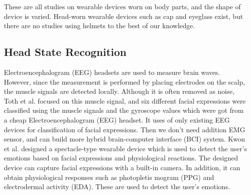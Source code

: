 \documentclass[sigchi,authordraft]{acmart}
\begin{document}

These are all studies on wearable devices worn on body parts, and the shape of device is varied. Head-worn wearable devices such as cap and eyeglass exist, but there are no studies using helmets to the best of our knowledge.


\subsection{Head State Recognition}
Electroencephalogram (EEG) headsets are used to measure brain waves. However, since the measurement is performed by placing electrodes on the scalp, the muscle signals are detected locally. Although it is often removed as noise, Toth et al.\cite{facial_expression_headset} focused on this muscle signal, and six different facial expressions were classified using the muscle signals and the gyroscope values which were got from a cheap Electroencephalogram (EEG) headset. It uses of only existing EEG devices for classification of facial expressions. Then we don't need addition EMG sensor, and can build more hybrid brain-computer interface (BCI) system. Kwon et al.\cite{facial_expression_glasses} designed a spectacle-type wearable device which is used to detect the user's emotions based on facial expressions and physiological reactions. The designed device can capture facial expressions with a built-in camera. In addition, it can obtain physiological responses such as photopletis mogram (PPG) and electrodermal activity (EDA). These are used to detect the user's emotions.\par
\end{document}
